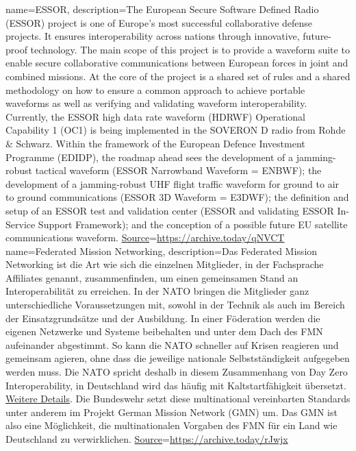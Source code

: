{%
	name=ESSOR,%
	description={The European Secure Software Defined Radio (ESSOR) project is one of Europe's most successful collaborative defense projects.
		It ensures interoperability across nations through innovative, future-proof technology.
		The main scope of this project is to provide a waveform suite to enable secure collaborative communications between European forces in joint and combined missions.
		At the core of the project is a shared set of rules and a shared methodology on how to ensure a common approach to achieve portable waveforms as well as verifying and validating waveform interoperability.
		\newline{}%
		Currently, the ESSOR high data rate waveform (HDRWF) Operational Capability 1 (OC1) is being implemented in the SOVERON D radio from Rohde \& Schwarz.
		Within the framework of the European Defence Investment Programme (EDIDP), the roadmap ahead sees the development of a jamming-robust tactical waveform (ESSOR Narrowband Waveform = ENBWF);
		the development of a jamming-robust UHF flight traffic waveform for ground to air to ground communications (ESSOR 3D Waveform = E3DWF);
		the definition and setup of an ESSOR test and validation center (ESSOR and validating ESSOR In-Service Support Framework);
		and the conception of a possible future EU satellite communications waveform.
		\href{https://www.rohde-schwarz.com/de/loesungen/aerospace-and-defense/land/tactical-communications/essor/essor_258052.html}{Source}=\url{https://archive.today/qNVCT}
	}%
}
%
{%
	name=Federated Mission Networking,%
	description={Das Federated Mission Networking ist die Art wie sich die einzelnen Mitglieder, in der Fachsprache Affiliates genannt,
		zusammenfinden, um einen gemeinsamen Stand an Interoperabilität zu erreichen.
		In der NATO bringen die Mitglieder ganz unterschiedliche Voraussetzungen mit,
		sowohl in der Technik als auch im Bereich der Einsatzgrundsätze und der Ausbildung.
		In einer Föderation werden die eigenen Netzwerke und Systeme beibehalten und unter dem Dach des FMN aufeinander abgestimmt.
		So kann die NATO schneller auf Krisen reagieren und gemeinsam agieren, 
		ohne dass die jeweilige nationale Selbstständigkeit aufgegeben werden muss.
		Die NATO spricht deshalb in diesem Zusammenhang von Day Zero Interoperability,
		in Deutschland wird das häufig mit Kaltstartfähigkeit übersetzt.
		\href{https://www.bundeswehr.de/de/organisation/cyber-und-informationsraum/aktuelles/fmn-grundlage-einsaetze-uebungen-5421864}{Weitere Details}.
		\newline{}
		Die Bundeswehr setzt diese multinational vereinbarten Standards unter anderem im Projekt German Mission Network (GMN) um.
		Das GMN ist also eine Möglichkeit, die multinationalen Vorgaben des FMN für ein Land wie Deutschland zu verwirklichen.
		\href{https://www.bundeswehr.de/de/organisation/cyber-und-informationsraum/aktuelles/nato-uebung-cwix-interview-5956132}{Source}=\url{https://archive.today/rJwjx}
		}%
}
